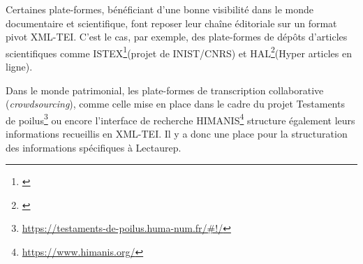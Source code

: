 Certaines plate-formes, bénéficiant d'une bonne visibilité dans le monde documentaire et scientifique, font reposer leur chaîne éditoriale sur un format pivot XML-TEI. C'est le cas, par exemple, des plate-formes de dépôts d'articles scientifiques comme ISTEX\footnote{\cite{inistcnrs_istex_2020}}(projet de INIST/CNRS) et HAL\footnote{\cite{capelli_tei_2015}}(Hyper articles en ligne). 

Dans le monde patrimonial, les plate-formes de transcription collaborative (\textit{crowdsourcing}), comme celle mise en place dans le cadre du projet Testaments de poilus\footnote{\url{https://testaments-de-poilus.huma-num.fr/\#!/}} ou encore l'interface de recherche HIMANIS\footnote{\url{https://www.himanis.org/}} structure également leurs informations recueillis en XML-TEI. Il y a donc une place pour la structuration des informations spécifiques à Lectaurep.\\

